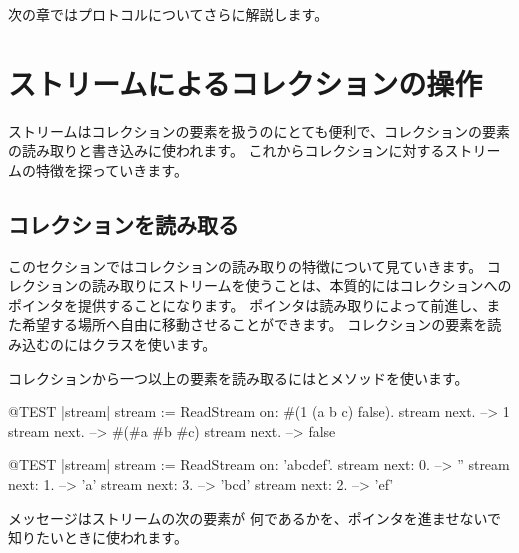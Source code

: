 \documentclass[a4paper,10pt,twoside]{book}
\begin{document}
次の章ではプロトコルについてさらに解説します。

\section{ストリームによるコレクションの操作}

ストリームはコレクションの要素を扱うのにとても便利で、コレクションの要素の読み取りと書き込みに使われます。
これからコレクションに対するストリームの特徴を探っていきます。


\subsection{コレクションを読み取る}

このセクションではコレクションの読み取りの特徴について見ていきます。
コレクションの読み取りにストリームを使うことは、本質的にはコレクションへのポインタを提供することになります。
ポインタは読み取りによって前進し、また希望する場所へ自由に移動させることができます。
コレクションの要素を読み込むのにはクラスを使います。

コレクションから一つ以上の要素を読み取るにはとメソッドを使います。

\begin{code}{@TEST |stream|}
stream := ReadStream on: #(1 (a b c) false).
stream next. -->   1
stream next. -->   #(#a #b #c)
stream next. -->   false
\end{code}

\begin{code}{@TEST |stream|}
stream := ReadStream on: 'abcdef'.
stream next: 0. -->   ''
stream next: 1. -->   'a'
stream next: 3. -->   'bcd'
stream next: 2. -->   'ef'
\end{code}

メッセージはストリームの次の要素が
何であるかを、ポインタを進ませないで知りたいときに使われます。

\noindent
\end{document}
